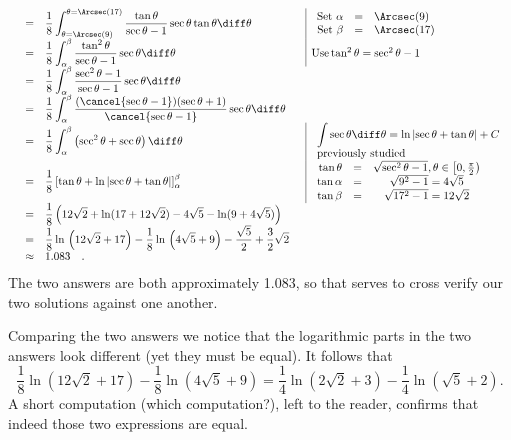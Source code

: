 {\[\begin{array}{rcll|l}
&=&\displaystyle \frac{1}{8}\int_{\theta=\Arcsec(9) }^{\theta=\Arcsec(17)}\frac{\tan \theta}{\sec \theta - 1} \sec \theta \tan \theta \diff \theta  && 
\begin{array}{rcl}
\text{Set }\alpha&=&\Arcsec(9)\\ 
\text{Set }\beta&=&\Arcsec(17)\\ 
\end{array}
\\
&=&\displaystyle \frac{1}{8}\int_{\alpha }^{\beta}\frac{\tan^2 \theta}{\sec \theta - 1} \sec \theta \diff \theta && \text{Use} \tan^2\theta=\sec^2\theta-1\\
&=&\displaystyle \frac{1}{8}\int_{\alpha }^{\beta}\frac{\sec^2 \theta-1}{\sec \theta - 1} \sec \theta \diff \theta \\
&=&\displaystyle \frac{1}{8}\int_{\alpha }^{\beta}\frac{(\cancel{ \sec\theta-1})(\sec \theta+1)}{\cancel{\sec \theta - 1}} \sec \theta \diff \theta \\
&=&\displaystyle \frac{1}{8}\int_{\alpha }^{\beta}\left(\sec^2\theta+ \sec \theta \right)\diff \theta && \begin{array}{l}\displaystyle\int\sec \theta\diff \theta= \ln\left|\sec\theta+\tan\theta\right|+C\\ \text{previously studied}\end{array}\\
&=&\displaystyle \frac{1}{8}\left[\tan \theta +\ln \left|\sec\theta+\tan\theta\right| \right]_{\alpha}^{\beta} && \begin{array}{rlc}\tan \theta &=& \sqrt{\sec^2\theta-1}, \theta\in\left[0,\frac{\pi}{2}\right) \\ \tan \alpha&=&\sqrt{9^2-1}=4\sqrt{5}\\ 
\tan \beta&=& \sqrt{17^2-1}=12\sqrt{2} \end{array}  \\
&=&\displaystyle \frac{1}{8}\left( 12\sqrt{2} +\ln (17+12\sqrt{2})-4\sqrt{5}-\ln (9+4\sqrt{5})\right) \\
&=&\displaystyle \frac{1}{8} \ln{}\left(12\sqrt{2}+17\right)-\frac{1}{8} \ln{}\left(4\sqrt{5}+9\right)-\frac{\sqrt{5}}{2}+\frac{3}{2}\sqrt{2} \\
&\approx& 1.083\quad.
\end{array}
\]
The two answers are both approximately 1.083, so that serves to cross verify our two solutions against one another. 

Comparing the two answers we notice that the logarithmic parts in the two answers look different (yet they must be equal). It follows that 
\[
\frac{1}{8} \ln{}\left(12\sqrt{2}+17\right)-\frac{1}{8} \ln{}\left(4\sqrt{5}+9\right) = \frac{1}{4} \ln{}\left(2\sqrt{2}+3\right)-\frac{1}{4} \ln{}\left(\sqrt{5}+2\right).
\]
A short computation (which computation?), left to the reader, confirms that indeed those two expressions are equal.

}